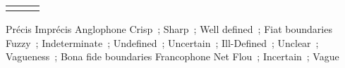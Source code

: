\begin{tabular}{ccc}
  &&
\end{tabular}

Précis
Imprécis
Anglophone
Crisp ; Sharp ; Well defined ; Fiat boundaries
Fuzzy ; Indeterminate ; Undefined ; Uncertain ; Ill-Defined ; Unclear ; Vagueness ; Bona fide boundaries
Francophone
Net
Flou ; Incertain ; Vague
